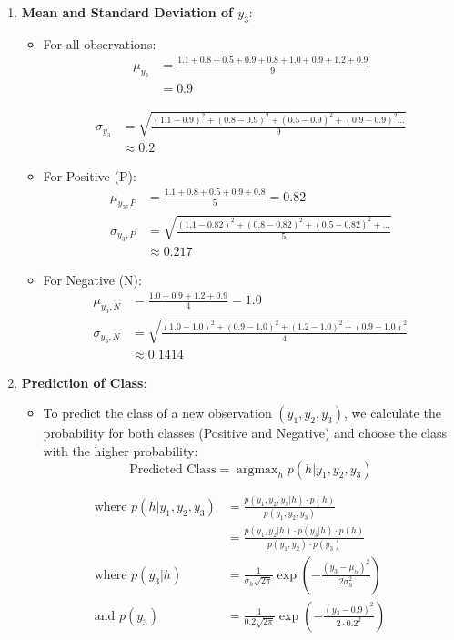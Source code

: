 \documentclass{article}
\DeclareMathOperator*{\argmax}{argmax}
\begin{document}
\begin{enumerate}[leftmargin=\labelsep]
\begin{enumerate}
  \item \textbf{Mean and Standard Deviation of \(y_3\)}:
  \begin{itemize}
      \item For all observations:  
      \begin{align*}
        \mu_{y_3} &= \frac{1.1 + 0.8 + 0.5 + 0.9 + 0.8 + 1.0 + 0.9 + 1.2 + 0.9}{9} \\ 
              &= 0.9
      \end{align*}
      
      \begin{align*}
        \sigma_{y_3} &= \sqrt{\frac{(1.1 - 0.9)^2 + (0.8 - 0.9)^2 + (0.5 - 0.9)^2 + (0.9 - 0.9)^2...}{9}} \\
                  &\approx 0.2
      \end{align*}
      
      \item For Positive (P):
      \begin{align*}
        \mu_{y_3,P} &= \frac{1.1 + 0.8 + 0.5 + 0.9 + 0.8}{5} = 0.82 \\
        \sigma_{y_3,P} &= \sqrt{\frac{(1.1 - 0.82)^2 + (0.8 - 0.82)^2 + (0.5 - 0.82)^2 + ...}{5}} \\
                  &\approx 0.217
      \end{align*}
      
      \item For Negative (N):
      \begin{align*}
        \mu_{y_3,N} &= \frac{1.0 + 0.9 + 1.2 + 0.9}{4} = 1.0 \\
        \sigma_{y_3,N} &= \sqrt{\frac{(1.0 - 1.0)^2 + (0.9 - 1.0)^2 + (1.2 - 1.0)^2 + (0.9 - 1.0)^2}{4}} \\
                  &\approx 0.1414
      \end{align*}

  \end{itemize}

  \item \textbf{Prediction of Class}:
  \begin{itemize}
      \item To predict the class of a new observation \((y_1, y_2, y_3)\), we calculate the probability for both classes (Positive and Negative) and choose the class with the higher probability:
      \[
      \text{Predicted Class} = \argmax_h p(h | y_1, y_2, y_3)
      \]
  \end{itemize}
  
  \begin{align*}
  \text{where } p(h | y_1, y_2, y_3) &= \frac{p(y_1, y_2, y_3 | h) \cdot p(h)}{p(y_1, y_2, y_3)} \\[10pt]
  &= \frac{p(y_1, y_2 | h) \cdot p(y_3 | h) \cdot p(h)}{p(y_1, y_2) \cdot p(y_3)} \\[10pt]
  \text{where } p(y_3 | h) &= \frac{1}{\sigma_h \sqrt{2\pi}} \exp\left(-\frac{(y_3 - \mu_h)^2}{2\sigma_h^2}\right) \\[10pt]
  \text{and } p(y_3) &= \frac{1}{0.2 \sqrt{2\pi}} \exp\left(-\frac{(y_3 - 0.9)^2}{2 \cdot 0.2^2}\right)
  \end{align*}


\end{enumerate}
\end{enumerate}
\end{document}
